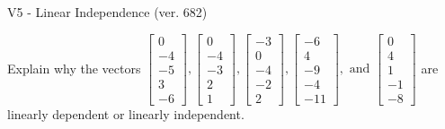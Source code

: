 \begin{exercise}
  \begin{exerciseTitle}V5 - Linear Independence (ver. 682)\end{exerciseTitle}
  \begin{exerciseStatement}
    Explain why the vectors \(\left[\begin{array}{r}
0 \\
-4 \\
-5 \\
3 \\
-6
\end{array}\right] , \left[\begin{array}{r}
0 \\
-4 \\
-3 \\
2 \\
1
\end{array}\right] , \left[\begin{array}{r}
-3 \\
0 \\
-4 \\
-2 \\
2
\end{array}\right] , \left[\begin{array}{r}
-6 \\
4 \\
-9 \\
-4 \\
-11
\end{array}\right] , \text{ and } \left[\begin{array}{r}
0 \\
4 \\
1 \\
-1 \\
-8
\end{array}\right]\) are linearly dependent or linearly independent.	



\end{exerciseStatement}
\end{exercise}
